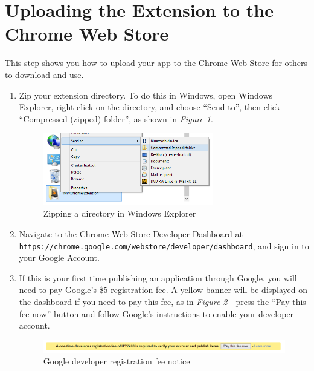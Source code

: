 \documentclass[11pt]{article}
\begin{document}
\section{Uploading the Extension to the Chrome Web Store}

This step shows you how to upload your app to the Chrome Web Store for others to download and use.

\begin{enumerate}
	\item Zip your extension directory. To do this in Windows, open Windows Explorer, right click on the directory, and choose ``Send to'', then click ``Compressed (zipped) folder'', as shown in \emph{Figure \ref{fig:zipext}}.\\

	\begin{figure}[htb]
	\centering
	\includegraphics[width=0.7\textwidth]{figures/zipext.png}
	\caption{Zipping a directory in Windows Explorer\label{fig:zipext}}
	\end{figure}

	\item Navigate to the Chrome Web Store Developer Dashboard at \\\texttt{https://chrome.google.com/webstore/developer/dashboard}, and sign in to your Google Account.

	\item If this is your first time publishing an application through Google, you will need to pay Google's \$5 registration fee. A yellow banner will be displayed on the dashboard if you need to pay this fee, as in \emph{Figure \ref{fig:regfee}} - press the ``Pay this fee now'' button and follow Google's instructions to enable your developer account.\\

	\begin{figure}[htb]
	\centering
	\includegraphics[width=1\textwidth]{figures/regfee.png}
	\caption{Google developer registration fee notice\label{fig:regfee}}
	\end{figure}


\end{enumerate}
\end{document}
